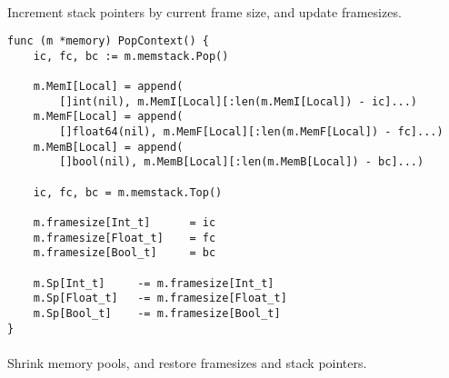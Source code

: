 \paragraph{} Increment stack pointers by current frame size, and update
framesizes.

\newpage

\begin{verbatim}
func (m *memory) PopContext() {
    ic, fc, bc := m.memstack.Pop()

    m.MemI[Local] = append(
        []int(nil), m.MemI[Local][:len(m.MemI[Local]) - ic]...)
    m.MemF[Local] = append(
        []float64(nil), m.MemF[Local][:len(m.MemF[Local]) - fc]...)
    m.MemB[Local] = append(
        []bool(nil), m.MemB[Local][:len(m.MemB[Local]) - bc]...)

    ic, fc, bc = m.memstack.Top()

    m.framesize[Int_t]      = ic
    m.framesize[Float_t]    = fc
    m.framesize[Bool_t]     = bc

    m.Sp[Int_t]     -= m.framesize[Int_t]
    m.Sp[Float_t]   -= m.framesize[Float_t]
    m.Sp[Bool_t]    -= m.framesize[Bool_t]
}
\end{verbatim}

\paragraph{} Shrink memory pools, and restore framesizes and stack pointers.

